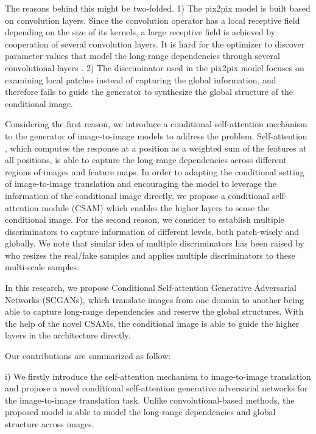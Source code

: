 The reasons behind this might be two-folded.
%
1) The pix2pix model is built based on convolution layers. Since the convolution operator has a local receptive field depending on the size of its kernels, a large receptive field is achieved by cooperation of several convolution layers. It is hard for the optimizer to discover parameter values that model the long-range dependencies through several convolutional layers \cite{SAGANs}. 
2) The discriminator used in the pix2pix model \cite{pix2pix} focuses on examining local patches instead of capturing the global information, and therefore fails to guide the generator to synthesize the global structure of the conditional image. 

Considering the first reason, we introduce a conditional self-attention mechanism to the generator of image-to-image models to address the problem.
Self-attention \cite{Non-local, Attention, MachineReading, SAGANs}, which computes the response at a position as a weighted sum of the features at all positions, is able to capture the long-range dependencies across different regions of images and feature maps. In order to adapting the conditional setting of image-to-image translation and encouraging the model to leverage the information of the conditional image directly, we propose a conditional self-attention module (CSAM) which enables the higher layers to sense the conditional image. 
%
For the second reason, we consider to establish multiple discriminators to capture information of different levels, both patch-wisely and globally. We note that similar idea of multiple discriminators has been raised by \cite{LaplaceGANs, SGANs, StackGANs, CRN} who resizes the real/fake samples and applies multiple discriminators to these multi-scale samples. 

In this research, we propose Conditional Self-attention Generative Adversarial Networks (SCGANs), which translate images from one domain to another being able to capture long-range dependencies and reserve the global structures. With the help of the novel CSAMs, the conditional image is able to guide the higher layers in the architecture directly.  

Our contributions are summarized as follow:

i) We firstly introduce the self-attention mechanism to image-to-image translation and propose a novel conditional self-attention generative adversarial networks for the image-to-image translation task. Unlike convolutional-based methods, the proposed model is able to model the long-range dependencies and global structure across images.

